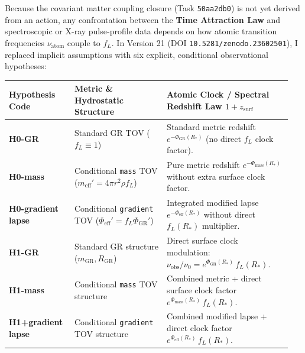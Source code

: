 
Because the covariant matter coupling closure (Task \texttt{50aa2db0}) is not yet derived from an action, any confrontation between the \textbf{Time Attraction Law} and spectroscopic or X-ray pulse-profile data depends on how atomic transition frequencies $\nu_{\text{atom}}$ couple to $f_L$. In Version 21 (DOI \texttt{10.5281/zenodo.23602501}), I replaced implicit assumptions with six explicit, conditional observational hypotheses:

\par
\begin{center}\vspace{-2pt}
{\footnotesize
\begin{tabular}{@{}>{\bfseries}p{0.22\linewidth}p{0.31\linewidth}p{0.42\linewidth}@{}}
\toprule
Hypothesis Code & Metric \& Hydrostatic Structure & Atomic Clock / Spectral Redshift Law $1 + z_{\text{surf}}$ \\
\midrule
H0-GR & Standard GR TOV ($f_L \equiv 1$) & Standard metric redshift $e^{-\Phi_{\text{GR}}(R_*)}$ (no direct $f_L$ clock factor). \\
H0-mass & Conditional \texttt{mass} TOV ($m_{\text{eff}}' = 4\pi r^2\rho f_L$) & Pure metric redshift $e^{-\Phi_{\text{mass}}(R_*)}$ without extra surface clock factor. \\
H0-gradient lapse & Conditional \texttt{gradient} TOV ($\Phi_{\text{eff}}' = f_L\Phi_{\text{GR}}'$) & Integrated modified lapse $e^{-\Phi_{\text{eff}}(R_*)}$ without direct $f_L(R_*)$ multiplier. \\
H1-GR & Standard GR structure ($m_{\text{GR}}, R_{\text{GR}}$) & Direct surface clock modulation: $\nu_{\text{obs}}/\nu_0 = e^{\Phi_{\text{GR}}(R_*)}\,f_L(R_*)$. \\
H1-mass & Conditional \texttt{mass} TOV structure & Combined metric + direct surface clock factor $e^{\Phi_{\text{mass}}(R_*)}\,f_L(R_*)$. \\
H1+gradient lapse & Conditional \texttt{gradient} TOV structure & Combined modified lapse + direct clock factor $e^{\Phi_{\text{eff}}(R_*)}\,f_L(R_*)$. \\
\bottomrule
\end{tabular}}
\end{center}

